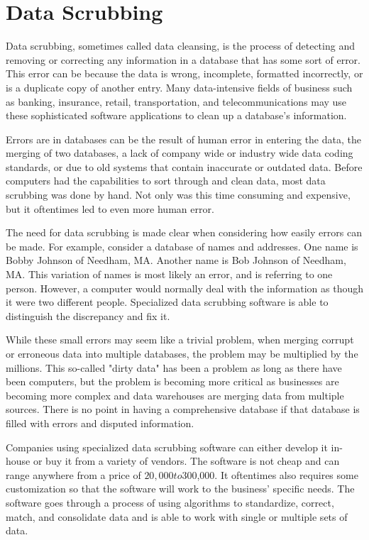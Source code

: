 
\newpage
\section{Data Scrubbing}

Data scrubbing, sometimes called data cleansing, is the process of detecting and removing or correcting any information in a database that has some sort of error. This error can be because the data is wrong, incomplete, formatted incorrectly, or is a duplicate copy of another entry. Many data-intensive fields of business such as banking, insurance, retail, transportation, and telecommunications may use these sophisticated software applications to clean up a database's information.

Errors are in databases can be the result of human error in entering the data, the merging of two databases, a lack of company wide or industry wide data coding standards, or due to old systems that contain inaccurate or outdated data. Before computers had the capabilities to sort through and clean data, most data scrubbing was done by hand. Not only was this time consuming and expensive, but it oftentimes led to even more human error.

The need for data scrubbing is made clear when considering how easily errors can be made. For example, consider a database of names and addresses. One name is Bobby Johnson of Needham, MA. Another name is Bob Johnson of Needham, MA. This variation of names is most likely an error, and is referring to one person. However, a computer would normally deal with the information as though it were two different people. Specialized data scrubbing software is able to distinguish the discrepancy and fix it.

While these small errors may seem like a trivial problem, when merging corrupt or erroneous data into multiple databases, the problem may be multiplied by the millions. This so-called "dirty data" has been a problem as long as there have been computers, but the problem is becoming more critical as businesses are becoming more complex and data warehouses are merging data from multiple sources. There is no point in having a comprehensive database if that database is filled with errors and disputed information.

Companies using specialized data scrubbing software can either develop it in-house or buy it from a variety of vendors. The software is not cheap and can range anywhere from a price of $20,000 to $300,000. It oftentimes also requires some customization so that the software will work to the business' specific needs. The software goes through a process of using algorithms to standardize, correct, match, and consolidate data and is able to work with single or multiple sets of data.

